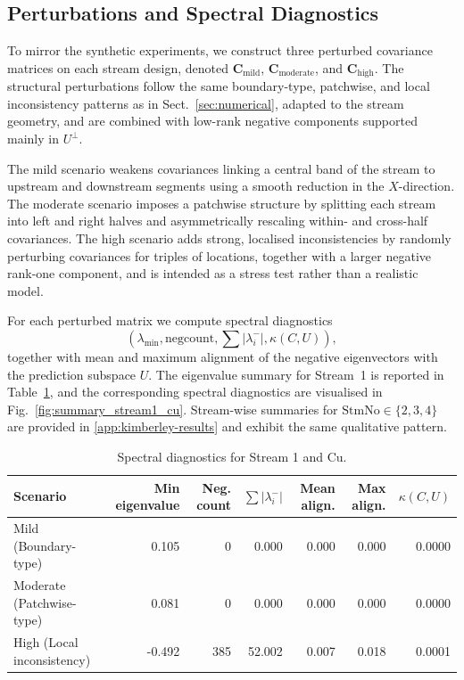 \documentclass[smallextended]{svjour3}
\newcommand{\1}{\mathbf{1}}
\begin{document}
\subsection{Perturbations and Spectral Diagnostics}

To mirror the synthetic experiments, we construct three perturbed covariance matrices on each stream design, denoted $\mathbf{C}_{\mathrm{mild}}$,
$\mathbf{C}_{\mathrm{moderate}}$, and $\mathbf{C}_{\mathrm{high}}$. The structural perturbations follow the same boundary-type, patchwise, and local inconsistency patterns as in Sect.~\ref{sec:numerical}, adapted to the stream geometry, and are combined with low-rank negative components supported mainly in $U^\perp$.

The mild scenario weakens covariances linking a central band of the stream to upstream and downstream segments using a smooth reduction in the $X$-direction. The moderate scenario imposes a patchwise structure by splitting each stream into left and right halves and asymmetrically rescaling within- and cross-half covariances. The high scenario adds strong, localised inconsistencies by randomly perturbing covariances for triples of locations, together with a larger negative rank-one component, and is intended as a stress test rather than a realistic model.

For each perturbed matrix we compute spectral diagnostics
\[
(\lambda_{\min},\text{negcount},\sum|\lambda_i^-|,\kappa(C,U)),
\]
together with mean and maximum alignment of the negative eigenvectors with the prediction subspace $U$. The eigenvalue summary for Stream~1 is reported in Table~\ref{tab:extended_eigen_stream_1_Cu}, and the corresponding spectral diagnostics are visualised in Fig.~\ref{fig:summary_stream1_cu}. Stream-wise summaries for $\mathrm{StmNo}\in\{2,3,4\}$ are provided in  \ref{app:kimberley-results} and exhibit the same qualitative pattern.

\begin{table}[htbp]
	\centering
	\caption{Spectral diagnostics for Stream 1 and Cu.}
	\label{tab:extended_eigen_stream_1_Cu}
	\begin{tabular}{lrrrrrr}
		\hline
		Scenario & Min eigenvalue & Neg. count & $\sum |\lambda_i^-|$ &
		Mean align. & Max align. & $\kappa(C,U)$ \\
		\hline
		Mild (Boundary-type)   & 0.105 &   0 &  0.000 & 0.000 & 0.000 & 0.0000 \\
		Moderate (Patchwise-type) & 0.081 &   0 &  0.000 & 0.000 & 0.000 & 0.0000 \\
		High (Local inconsistency) & -0.492 & 385 & 52.002 & 0.007 & 0.018 & 0.0001 \\
		\hline
	\end{tabular}
\end{table}
\end{document}
